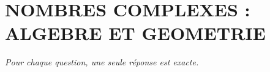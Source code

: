 
\section*{\textcolor{chapcolor}{\MakeUppercase{Nombres complexes : algebre et geometrie}}}

\begin{center}
\textit{Pour chaque question, une seule réponse est exacte.}
\end{center}

